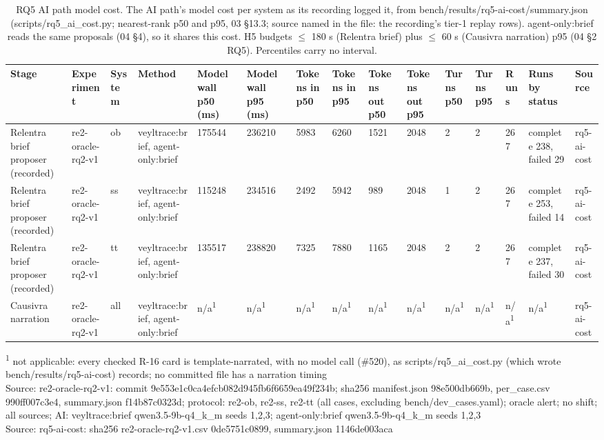 \begin{table}[t]
\centering
\caption{RQ5 AI path model cost. The AI path's model cost per system as its recording logged it, from bench/results/rq5-ai-cost/summary.json (scripts/rq5\_ai\_cost.py; nearest-rank p50 and p95, 03 \S{}13.3; source named in the file: the recording's tier-1 replay rows). agent-only:brief reads the same proposals (04 \S{}4), so it shares this cost. H5 budgets $\leq$ 180 s (Relentra brief) plus $\leq$ 60 s (Causivra narration) p95 (04 \S{}2 RQ5). Percentiles carry no interval.}
\label{tab:t08b-rq5-ai-cost}
\small
\begin{tabular}{lllllllllllllll}
\hline
Stage & Experiment & System & Method & Model wall p50 (ms) & Model wall p95 (ms) & Tokens in p50 & Tokens in p95 & Tokens out p50 & Tokens out p95 & Turns p50 & Turns p95 & Runs & Runs by status & Source \\
\hline
Relentra brief proposer (recorded) & re2-oracle-rq2-v1 & ob & veyltrace:brief, agent-only:brief & 175544 & 236210 & 5983 & 6260 & 1521 & 2048 & 2 & 2 & 267 & complete 238, failed 29 & rq5-ai-cost \\
Relentra brief proposer (recorded) & re2-oracle-rq2-v1 & ss & veyltrace:brief, agent-only:brief & 115248 & 234516 & 2492 & 5942 & 989 & 2048 & 1 & 2 & 267 & complete 253, failed 14 & rq5-ai-cost \\
Relentra brief proposer (recorded) & re2-oracle-rq2-v1 & tt & veyltrace:brief, agent-only:brief & 135517 & 238820 & 7325 & 7880 & 1165 & 2048 & 2 & 2 & 267 & complete 237, failed 30 & rq5-ai-cost \\
Causivra narration & re2-oracle-rq2-v1 & all & veyltrace:brief, agent-only:brief & n/a\textsuperscript{1} & n/a\textsuperscript{1} & n/a\textsuperscript{1} & n/a\textsuperscript{1} & n/a\textsuperscript{1} & n/a\textsuperscript{1} & n/a\textsuperscript{1} & n/a\textsuperscript{1} & n/a\textsuperscript{1} & n/a\textsuperscript{1} & rq5-ai-cost \\
\hline
\end{tabular}
\par\smallskip\footnotesize
\textsuperscript{1} not applicable: every checked R-16 card is template-narrated, with no model call (\#520), as scripts/rq5\_ai\_cost.py (which wrote bench/results/rq5-ai-cost) records; no committed file has a narration timing\\
Source: re2-oracle-rq2-v1: commit 9e553e1c0ca4efcb082d945fb6f6659ea49f234b; sha256 manifest.json 98e500db669b, per\_case.csv 990ff007c3e4, summary.json f14b87c0323d; protocol: re2-ob, re2-ss, re2-tt (all cases, excluding bench/dev\_cases.yaml); oracle alert; no shift; all sources; AI: veyltrace:brief qwen3.5-9b-q4\_k\_m seeds 1,2,3; agent-only:brief qwen3.5-9b-q4\_k\_m seeds 1,2,3\\
Source: rq5-ai-cost: sha256 re2-oracle-rq2-v1.csv 0de5751c0899, summary.json 1146de003aca\\
\end{table}
